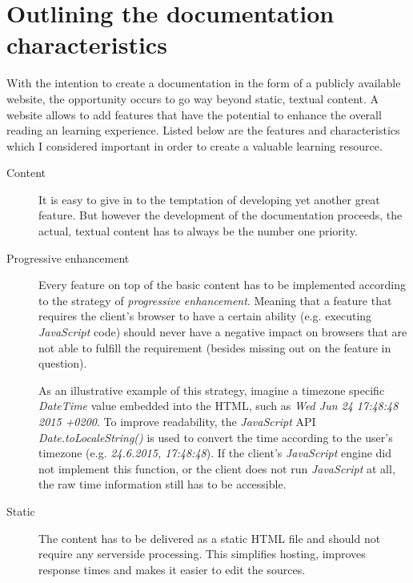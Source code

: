 \section{Outlining the documentation characteristics}

With the intention to create a documentation in the form of a publicly available website, the opportunity occurs to go way beyond static, textual content. A website allows to add features that have the potential to enhance the overall reading an learning experience. Listed below are the features and characteristics which I considered important in order to create a valuable learning resource.

\begin{description}

	\item[Content]\hfill

	It is easy to give in to the temptation of developing yet another great feature. But however the development of the documentation proceeds, the actual, textual content has to always be the number one priority.

	\item[Progressive enhancement]\hfill

	Every feature on top of the basic content has to be implemented according to the strategy of \textit{progressive enhancement}. Meaning that a feature that requires the client's browser to have a certain ability (e.g. executing \textit{JavaScript} code) should never have a negative impact on browsers that are not able to fulfill the requirement (besides missing out on the feature in question).

	As an illustrative example of this strategy, imagine a timezone specific \textit{DateTime} value embedded into the \ac{HTML}, such as \textit{Wed Jun 24 17:48:48 2015 +0200}. To improve readability, the \textit{JavaScript} \ac{API} \textit{Date.toLocaleString()} is used to convert the time according to the user's timezone (e.g. \textit{24.6.2015, 17:48:48}). If the client's \textit{JavaScript} engine did not implement this function, or the client does not run \textit{JavaScript} at all, the raw time information still has to be accessible.

	\item[Static]\hfill

	The content has to be delivered as a static \ac{HTML} file and should not require any serverside processing. This simplifies hosting, improves response times and makes it easier to edit the sources.


\end{description}
